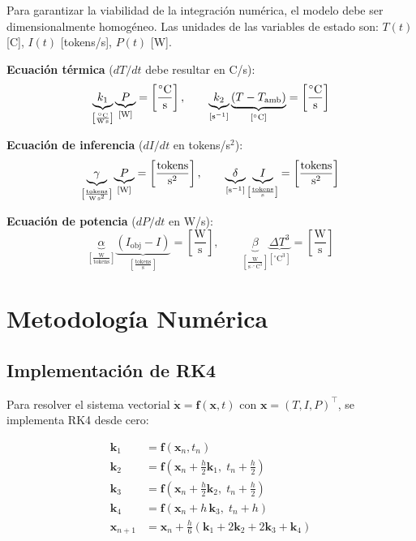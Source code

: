 \documentclass[10pt, twocolumn]{article}
\begin{document}
Para garantizar la viabilidad de la integración numérica, el modelo debe ser
dimensionalmente homogéneo. Las unidades de las variables de estado son:
$T(t)$ [\textdegree C], $I(t)$ [tokens/s], $P(t)$ [W].

\medskip
\noindent\textbf{Ecuación térmica} ($dT/dt$ debe resultar en \textdegree C/s):
\[
\underbrace{k_1}_{\left[\frac{^\circ\text{C}}{\text{W\,s}}\right]}
\underbrace{P}_{\left[\text{W}\right]}
= \left[\frac{^\circ\text{C}}{\text{s}}\right], \qquad
\underbrace{k_2}_{\left[\text{s}^{-1}\right]}
\underbrace{(T - T_{\text{amb}})}_{\left[^\circ\text{C}\right]}
= \left[\frac{^\circ\text{C}}{\text{s}}\right]
\]

\noindent\textbf{Ecuación de inferencia} ($dI/dt$ en tokens/s$^2$):
\[
\underbrace{\gamma}_{\left[\frac{\text{tokens}}{\text{W\,s}^2}\right]}
\underbrace{P}_{\left[\text{W}\right]}
= \left[\frac{\text{tokens}}{\text{s}^2}\right], \qquad
\underbrace{\delta}_{\left[\text{s}^{-1}\right]}
\underbrace{I}_{\left[\frac{\text{tokens}}{\text{s}}\right]}
= \left[\frac{\text{tokens}}{\text{s}^2}\right]
\]

\noindent\textbf{Ecuación de potencia} ($dP/dt$ en W/s):
\[
\underbrace{\alpha}_{\left[\frac{\text{W}}{\text{tokens}}\right]}
\underbrace{(I_{\text{obj}}-I)}_{\left[\frac{\text{tokens}}{\text{s}}\right]}
= \left[\frac{\text{W}}{\text{s}}\right], \qquad
\underbrace{\beta}_{\left[\frac{\text{W}}{\text{s}\cdot^\circ\text{C}^3}\right]}
\underbrace{\Delta T^3}_{\left[^\circ\text{C}^3\right]}
= \left[\frac{\text{W}}{\text{s}}\right]
\]

\section{Metodología Numérica}
\label{sec:numerica}

\subsection{Implementación de RK4}

Para resolver el sistema vectorial $\dot{\mathbf{x}} = \mathbf{f}(\mathbf{x}, t)$
con $\mathbf{x} = (T, I, P)^\top$, se implementa RK4 desde cero:

\begin{align*}
  \mathbf{k}_1 &= \mathbf{f}(\mathbf{x}_n, t_n) \\
  \mathbf{k}_2 &= \mathbf{f}\!\left(\mathbf{x}_n + \tfrac{h}{2}\mathbf{k}_1,\;
                                    t_n + \tfrac{h}{2}\right) \\
  \mathbf{k}_3 &= \mathbf{f}\!\left(\mathbf{x}_n + \tfrac{h}{2}\mathbf{k}_2,\;
                                    t_n + \tfrac{h}{2}\right) \\
  \mathbf{k}_4 &= \mathbf{f}(\mathbf{x}_n + h\,\mathbf{k}_3,\; t_n + h) \\[4pt]
  \mathbf{x}_{n+1} &= \mathbf{x}_n
    + \frac{h}{6}(\mathbf{k}_1 + 2\mathbf{k}_2 + 2\mathbf{k}_3 + \mathbf{k}_4)
\end{align*}
\end{document}

